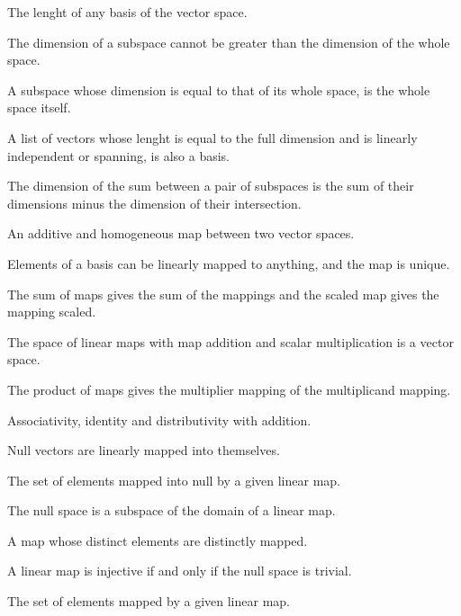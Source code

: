 \begin{multicols}{3}
  The lenght of any basis of the vector space.
  
  The dimension of a subspace cannot be greater than the dimension of the whole space.
  
  A subspace whose dimension is equal to that of its whole space, is the whole space itself.
  
  A list of vectors whose lenght is equal to the full dimension and is linearly independent or spanning, is also a basis.
  
  The dimension of the sum between a pair of subspaces is the sum of their dimensions minus the dimension of their intersection.

  An additive and homogeneous map between two vector spaces.

  Elements of a basis can be linearly mapped to anything, and the map is unique.

  The sum of maps gives the sum of the mappings and the scaled map gives the mapping scaled.
  
  The space of linear maps with map addition and scalar multiplication is a vector space.

  The product of maps gives the multiplier mapping of the multiplicand mapping.

  Associativity, identity and distributivity with addition.

  Null vectors are linearly mapped into themselves.

  The set of elements mapped into null by a given linear map.

  The null space is a subspace of the domain of a linear map.

  A map whose distinct elements are distinctly mapped.

  A linear map is injective if and only if the null space is trivial.

  The set of elements mapped by a given linear map.


\end{multicols}
